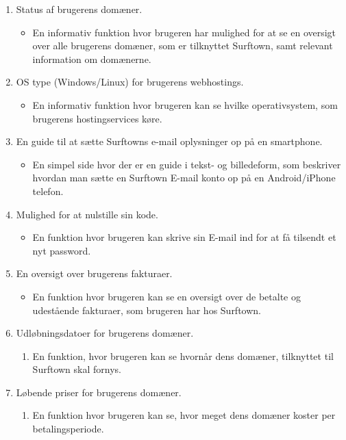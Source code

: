 \documentclass[12pt]{article}
\begin{document}
\begin{enumerate}
\begin{itemize}
	\end{itemize}
  \item{Status af brugerens domæner.}
	\begin{itemize}
		\item{En informativ funktion hvor brugeren har mulighed for at se en oversigt over alle brugerens domæner, som er tilknyttet Surftown, samt relevant information om domænerne.}
	\end{itemize}
  \item{OS type (Windows/Linux) for brugerens webhostings.}
	\begin{itemize}
		\item{En informativ funktion hvor brugeren kan se hvilke operativsystem, som brugerens hostingservices køre.}
	\end{itemize}
  \item{En guide til at sætte Surftowns e-mail oplysninger op på en smartphone.}
	\begin{itemize}
		\item{En simpel side hvor der er en guide i tekst- og billedeform, som beskriver hvordan man sætte en Surftown E-mail konto op på en Android/iPhone telefon.}
	\end{itemize}
  \item{Mulighed for at nulstille sin kode.}
	\begin{itemize}
		\item{En funktion hvor brugeren kan skrive sin E-mail ind for at få tilsendt et nyt password.}
	\end{itemize}
  \item{En oversigt over brugerens fakturaer.}
	\begin{itemize}
		\item{En funktion hvor brugeren kan se en oversigt over de betalte og udestående fakturaer, som brugeren har hos Surftown.}
	\end{itemize}
  \item{Udløbningsdatoer for brugerens domæner.}
	\begin{enumerate}
		\item{En funktion, hvor brugeren kan se hvornår dens domæner, tilknyttet til Surftown skal fornys.}
	\end{enumerate}
  \item{Løbende priser for brugerens domæner.}
	\begin{enumerate}
		\item{En funktion hvor brugeren kan se, hvor meget dens domæner koster per betalingsperiode.}
	\end{enumerate}

\end{enumerate}
\end{document}
